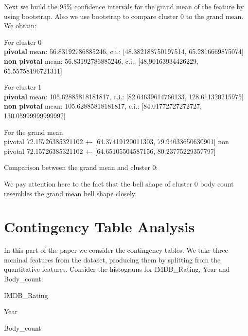 \documentclass[a4paper,14pt]{article}
\begin{document}
\normalsize


Next we build the 95\% confidence intervals for the grand mean of the feature by using bootstrap. Also we use bootstrap to compare cluster 0 to the grand mean.  We obtain:

\footnotesize
For cluster 0 \\
\textbf{pivotal} mean: 56.83192786885246, c.i.: [48.382188750197514, 65.2816669875074] \\
\textbf{non pivotal} mean: 56.83192786885246, c.i.: [48.90163934426229, 65.55758196721311]

For cluster 1 \\
\textbf{pivotal} mean:  105.62885818181817, c.i.:  [82.64639614766133, 128.611320215975] \\
\textbf{non pivotal} mean:  105.62885818181817, c.i.:  [84.01772727272727, 130.05999999999992]

For the grand mean \\
pivotal 72.15726385321102 +- [64.37419120011303, 79.94033650630901]
non pivotal 72.15726385321102 +- [64.65105504587156, 80.23775229357797]

\normalsize

Comparison between the grand mean and cluster 0:
    \begin{center}
\end{center}
We pay attention here to the fact that the bell shape of cluster 0 body count resembles the grand mean bell shape closely.
    \begin{center}
\end{center}


    \section{Contingency Table Analysis}
    
In this part of the paper we consider the contingency tables. We take three nominal features from the dataset, producing them by splitting from the quantitative features. Consider the histograms for IMDB\_Rating, Year and Body\_count:

\begin{multicols}{2}
    \begin{center}
	IMDB\_Rating
\end{center}
\begin{center}
	Year
\end{center}
    \begin{center}
	 Body\_count
\end{center}

\end{multicols}
\end{document}
